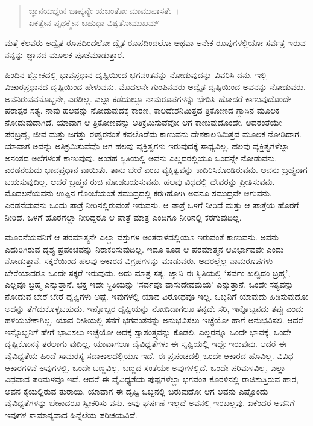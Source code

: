 \begin{verse}
ಜ್ಞಾನಯಜ್ಞೇನ ಚಾಪ್ಯನ್ಯೇ ಯಜಂತೋ ಮಾಮುಪಾಸತೇ~।\\ಏಕತ್ವೇನ ಪೃಥಕ್ತ್ವೇನ ಬಹುಧಾ ವಿಶ್ವತೋಮುಖಮ್ 
\end{verse}

{\small ಮತ್ತೆ ಕೆಲವರು ಅದ್ವೈತ ರೂಪದಿಂದಲೋ ದ್ವೈತ ರೂಪದಿಂದಲೋ ಅಥವಾ ಅನೇಕ ರೂಪುಗಳಲ್ಲಿಯೋ ಸರ್ವತ್ರ ಇರುವ ನನ್ನನ್ನು ಜ್ಞಾನದ ಮೂಲಕ ಪೂಜೆಮಾಡುತ್ತಾರೆ.}

ಹಿಂದಿನ ಶ್ಲೋಕದಲ್ಲಿ ಭಾವಪ್ರಧಾನ ದೃಷ್ಟಿಯಿಂದ ಭಗವಂತನನ್ನು ನೋಡುವುದನ್ನು ವಿವರಿಸಿ ದನು. ಇಲ್ಲಿ ವಿಚಾರಪ್ರಧಾನದ ದೃಷ್ಟಿಯಿಂದ ಹೇಳುವನು. ಮೊದಲನೇ ಗುಂಪಿನವರು ಅದ್ವೈತ ದೃಷ್ಟಿಯಿಂದ ಅವನನ್ನು ನೋಡುವರು. ಅವನಿರುವವನೊಬ್ಬನೇ, ಎರಡಿಲ್ಲ. ಎಲ್ಲಾ ಕಡೆಯಲ್ಲೂ ನಾಮರೂಪಗಳನ್ನು ಭೇದಿಸಿ ಹೋದರೆ ಕಾಣುವುದೊಂದೇ ಪರಾತ್ಪರ ಸತ್ಯ. ನಾವು ಹಲವನ್ನು ನೋಡುವುದಕ್ಕೆ ಕಾರಣ, ಕಾಲದೇಶನಿಮಿತ್ತದ ತ್ರಿಕೋಣದ ಗ್ಲಾಸಿನ ಮೂಲಕ ನೋಡುವುದಾಗಿದೆ. ಯಾವಾಗ ಆ ತ್ರಿಕೋಣವನ್ನು ಅತಿಕ್ರಮಿಸುವೆವೋ ಆಗ ಕಾಣುವುದೊಂದೇ. ಅದರಂತೆಯೇ ಪರಬ್ರಹ್ಮ, ಜೀವ ಮತ್ತು ಜಗತ್ತು ಈಶ್ವರನಂತೆ ಕವಲೊಡೆದು ಕಾಣುವನು ದೇಶಕಾಲನಿಮಿತ್ತದ ಮೂಲಕ ನೋಡಿದಾಗ. ಯಾವಾಗ ಅದನ್ನು ಅತಿಕ್ರಮಿಸುವೆವೊ ಆಗ ಹಲವು ವ್ಯಕ್ತಿತ್ವಗಳು ಇರುವುದಕ್ಕೆ ಸಾಧ್ಯವಿಲ್ಲ. ಹಲವು ವ್ಯಕ್ತಿತ್ವಗಳೆಲ್ಲಾ ಅನಂತದ ಅಲೆಗಳಂತೆ ಕಾಣುವುವು. ಅಂತಹ ಸ್ಥಿತಿಯಲ್ಲಿ ಅವನು ಎಲ್ಲದರಲ್ಲಿಯೂ ಒಂದನ್ನೇ ನೋಡುವನು. ಎರಡನೆಯದು ಭಾವಪ್ರಧಾನ ವಾಯಿತು. ತಾನು ಬೇರೆ ಎಂಬ ವ್ಯಕ್ತಿತ್ವವನ್ನು ಕಾದಿರಿಸಿಕೊಂಡಿರುವನು. ಅವನು ಬ್ರಹ್ಮನಾಗ ಬಯಸುವುದಿಲ್ಲ. ಆದರೆ ಬ್ರಹ್ಮನ ರುಚಿ ನೋಡಬಯಸುವನು. ಹಲವು ವಿಧದಲ್ಲಿ ದೇವರನ್ನು ಪ್ರೀತಿಸುವನು. ಮೊದಲನೆಯವನು ಉಪ್ಪಿನ ಗೊಂಬೆಯಂತೆ ಸಮುದ್ರದಲ್ಲಿ ಕರಗಿಹೋಗಿ ಅವನೂ ಸಮುದ್ರವೇ ಆಗುವನು. ಎರಡನೆಯವನು ಒಂದು ಪಾತ್ರೆ ನೀರಿನಲ್ಲಿರುವಂತೆ ಇರುವನು. ಆ ಪಾತ್ರೆ ಒಳಗೆ ನೀರಿದೆ ಮತ್ತು ಆ ಪಾತ್ರೆಯ ಹೊರಗೆ ನೀರಿದೆ. ಒಳಗೆ ಹೊರಗೆಲ್ಲಾ ನೀರಿದ್ದರೂ ಆ ಪಾತ್ರೆ ಮಾತ್ರ ಎಂದಿಗೂ ನೀರಿನಲ್ಲಿ ಕರಗುವುದಿಲ್ಲ.

ಮೂರನೆಯವನಿಗೆ ಆ ಪರಮಾತ್ಮನೇ ಎಲ್ಲಾ ವಸ್ತುಗಳ ಅಂತರಾಳದಲ್ಲಿಯೂ ಇರುವಂತೆ ಕಾಣುವನು. ಅವನು ಎದುರಿಗಿರುವ ದೃಶ್ಯ ಪ್ರಪಂಚವನ್ನು ನಿರಾಕರಿಸುವುದಿಲ್ಲ. ಇದೂ ಕೂಡ ಆ ಪರಮಾತ್ಮನ ಆವಿರ್ಭಾವವೇ ಎಂದು ನೋಡುತ್ತಾನೆ. ಸಕ್ಕರೆಯಿಂದ ಹಲವು ಆಕಾರದ ವಿಗ್ರಹಗಳನ್ನು ಮಾಡುವರು. ಅದರಲ್ಲೆಲ್ಲ ನಾಮರೂಪಗಳು ಬೇರೆಯಾದರೂ ಒಂದೇ ಸಕ್ಕರೆ ಇರುವುದು. ಅದು ಮಾತ್ರ ಸತ್ಯ. ಜ್ಞಾನಿ ಈ ಸ್ಥಿತಿಯಲ್ಲಿ ‘ಸರ್ವಂ ಖಲ್ವಿದಂ ಬ್ರಹ್ಮ’, ಎಲ್ಲವೂ ಬ್ರಹ್ಮ ಎನ್ನುತ್ತಾನೆ. ಭಕ್ತ ಇದೇ ಸ್ಥಿತಿಯನ್ನು ‘ಸರ್ವವೂ ವಾಸುದೇವಮಯ’ ಎನ್ನುತ್ತಾನೆ. ಒಂದೇ ಸತ್ಯವನ್ನು ನೋಡುವ ಬೇರೆ ಬೇರೆ ದೃಷ್ಟಿಗಳು ಅಷ್ಟೆ. ಇವುಗಳಲ್ಲಿ ಯಾವ ವಿರೋಧವೂ ಇಲ್ಲ. ಒಬ್ಬನಿಗೆ ಯಾವುದು ಹಿಡಿಸುವುದೋ ಅದನ್ನು ತೆಗೆದುಕೊಳ್ಳಬಹುದು. ಇನ್ನೊಬ್ಬರ ದೃಷ್ಟಿಯನ್ನು ನೋಡಿದಾಗಲೂ ತನ್ನದೇ ಸರಿ, ಇನ್ನೊಬ್ಬನದು ತಪ್ಪು ಎಂದು ಹಳಿಯಬೇಕಾಗಿಲ್ಲ. ಯಾವ ರೀತಿಯಲ್ಲಿ ತನಗೆ ಭಗವಂತನನ್ನು ಅನುಭವಿಸಲು ಇಚ್ಛೆಯೋ ಹಾಗೆ ಅನುಭವಿಸಲಿ. ಆದರೆ ಇನ್ನೊಬ್ಬನಿಗೆ ಹೇಗೆ ಭಾವಿಸಲು ಇಚ್ಛೆಯೋ ಅದಕ್ಕೆ ಸ್ವಾತಂತ್ರ್ಯವನ್ನು ಕೊಡಲಿ. ಎಲ್ಲರನ್ನೂ ಒಂದೇ ಭಾವಕ್ಕೆ, ಒಂದೇ ದೃಷ್ಟಿಕೋನಕ್ಕೆ ತರಲಾಗು ವುದಿಲ್ಲ. ಯಾವಾಗಲೂ ವೈವಿಧ್ಯತೆಗಳು ಈ ಸೃಷ್ಟಿಯಲ್ಲಿ ಇದ್ದೇ ಇರುವುವು. ಆದರೆ ಈ ವೈವಿಧ್ಯತೆಯ ಹಿಂದೆ ಸಾಮರಸ್ಯ ಸದಾಕಾಲದಲ್ಲಿಯೂ ಇದೆ. ಈ ಪ್ರಪಂಚದಲ್ಲಿ ಒಂದೇ ಆಕಾರದ ಹೂವಿಲ್ಲ. ವಿವಿಧ ಆಕಾರಗಳಿವೆ ಅವುಗಳಲ್ಲಿ. ಒಂದೇ ಬಣ್ಣವಿಲ್ಲ. ಬಣ್ಣದ ಸಂತೆಯೇ ಅವುಗಳಲ್ಲಿದೆ. ಒಂದೇ ಪರಿಮಳವಿಲ್ಲ, ಎಲ್ಲಾ ವಿಧವಾದ ಪರಿಮಳವೂ ಇದೆ. ಆದರೆ ಈ ವೈವಿಧ್ಯತೆಯ ಪುಷ್ಪಗಳೆಲ್ಲಾ ಭಗವಂತ ಕೊರಳಿನಲ್ಲಿ ರಾಜಿಸುತ್ತಿರುವ ಹಾರ, ಅವನ ಕೈಯಲ್ಲಿರುವ ತುರಾಯಿ. ಯಾವಾಗ ಈ ದೃಷ್ಟಿ ಒಬ್ಬನಲ್ಲಿ ಬರುವುದೋ ಆಗ ಅವನು ಎಷ್ಟೊಂದು ವೈವಿಧ್ಯತೆಗಳನ್ನು ಬೇಕಾದರೂ ಸ್ವೀಕರಿಸು ವನು. ಅವು ಘರ್ಷಣೆ ಇಲ್ಲದೆ ಅವನಲ್ಲಿ ಇರಬಲ್ಲವು. ಏಕೆಂದರೆ ಅವನಿಗೆ ಇವುಗಳ ಸಾಮಾನ್ಯವಾದ ಹಿನ್ನೆಲೆಯ ಪರಿಚಯವಿದೆ.

